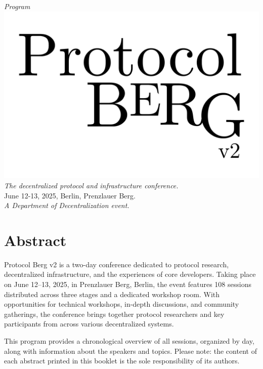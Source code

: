 \begin{titlepage}
  \begin{center}
    \textit{\huge Program}\\[1em]
    \includegraphics[width=\textwidth]{protocol.pdf}\\[1em]
    \textit{The decentralized protocol and infrastructure conference.}\\
    {June 12-13, 2025, Berlin, Prenzlauer Berg.}\\[1em]
    \vspace{\fill}
    \textit{\small A Department of Decentralization event.}
  \end{center}
\end{titlepage}

\shipout\null
\shipout\null
\newpage

\cleardoublepage
\pagestyle{fancy}

\section*{Abstract}
Protocol Berg v2 is a two-day conference dedicated to protocol research, decentralized infrastructure, and the experiences of core developers. Taking place on June 12–13, 2025, in Prenzlauer Berg, Berlin, the event features 108 sessions distributed across three stages and a dedicated workshop room. With opportunities for technical workshops, in-depth discussions, and community gatherings, the conference brings together protocol researchers and key participants from across various decentralized systems.

This program provides a chronological overview of all sessions, organized by day, along with information about the speakers and topics. Please note: the content of each abstract printed in this booklet is the sole responsibility of its authors.

\cleardoublepage

\tableofcontents

\cleardoublepage
